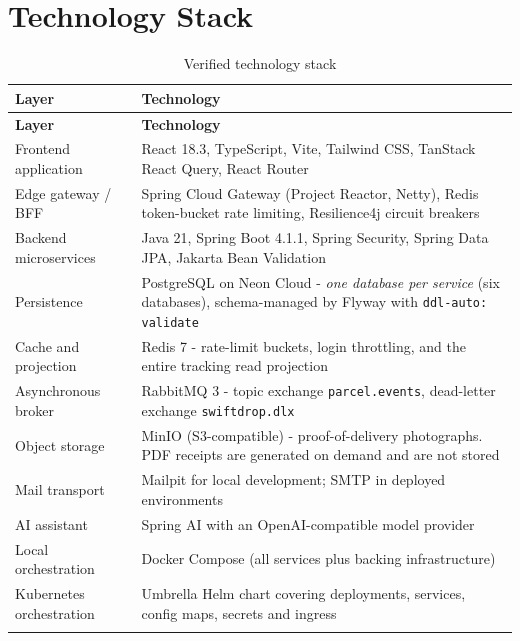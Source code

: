 \documentclass[11pt,a4paper,oneside,openany]{report}
\newcommand{\code}[1]{\texttt{\small #1}}
\begin{document}
\section{Technology Stack}
\begin{center}
\small
\begin{longtable}{@{}p{3.9cm}p{10.4cm}@{}}
\toprule
\textbf{Layer} & \textbf{Technology} \\
\midrule
\endfirsthead
\toprule
\textbf{Layer} & \textbf{Technology} \\
\midrule
\endhead
Frontend application & React 18.3, TypeScript, Vite, Tailwind CSS, TanStack React Query, React
Router \\
\addlinespace
Edge gateway / BFF & Spring Cloud Gateway (Project Reactor, Netty), Redis token-bucket rate
limiting, Resilience4j circuit breakers \\
\addlinespace
Backend microservices & Java 21, Spring Boot 4.1.1, Spring Security, Spring Data JPA, Jakarta Bean
Validation \\
\addlinespace
Persistence & PostgreSQL on Neon Cloud - \emph{one database per service} (six databases),
schema-managed by Flyway with \code{ddl-auto: validate} \\
\addlinespace
Cache and projection & Redis 7 - rate-limit buckets, login throttling, and the entire
tracking read projection \\
\addlinespace
Asynchronous broker & RabbitMQ 3 - topic exchange \code{parcel.events}, dead-letter exchange
\code{swiftdrop.dlx} \\
\addlinespace
Object storage & MinIO (S3-compatible) - proof-of-delivery photographs. PDF receipts are
generated on demand and are not stored \\
\addlinespace
Mail transport & Mailpit for local development; SMTP in deployed environments \\
\addlinespace
AI assistant & Spring AI with an OpenAI-compatible model provider \\
\addlinespace
Local orchestration & Docker Compose (all services plus backing infrastructure) \\
\addlinespace
Kubernetes orchestration & Umbrella Helm chart covering deployments, services, config maps, secrets and ingress \\
\bottomrule
\caption{Verified technology stack}\label{tab:stack}
\end{longtable}
\end{center}

\end{document}
